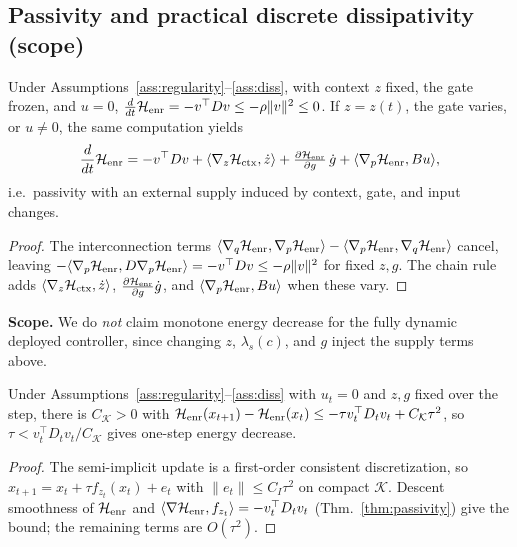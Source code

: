 \subsection{Passivity and practical discrete dissipativity (scope)}
\begin{theorem}\label{thm:passivity}
Under Assumptions~\ref{ass:regularity}--\ref{ass:diss}, with context $z$ fixed,
the gate frozen, and $u=0$,
$\frac{d}{dt}\mathcal{H}_{\rm enr}=-v^\top D v\le-\rho\|v\|^2\le0$. If $z=z(t)$, the
gate varies, or $u\ne0$, the same computation yields
\[
  \frac{d}{dt}\mathcal{H}_{\rm enr}
  =-v^\top D v
  +\langle\nabla_z\mathcal{H}_{\rm ctx},\dot z\rangle
  +\tfrac{\partial\mathcal{H}_{\rm enr}}{\partial g}\,\dot g
  +\langle\nabla_p\mathcal{H}_{\rm enr},Bu\rangle,
\]
i.e.\ passivity with an external supply induced by context, gate, and input
changes.
\end{theorem}
\begin{proof}
The interconnection terms
$\langle\nabla_q\mathcal{H}_{\rm enr},\nabla_p\mathcal{H}_{\rm enr}\rangle
-\langle\nabla_p\mathcal{H}_{\rm enr},\nabla_q\mathcal{H}_{\rm enr}\rangle$ cancel, leaving
$-\langle\nabla_p\mathcal{H}_{\rm enr},D\nabla_p\mathcal{H}_{\rm enr}\rangle=-v^\top Dv\le-\rho\|v\|^2$
for fixed $z,g$. The chain rule adds
$\langle\nabla_z\mathcal{H}_{\rm ctx},\dot z\rangle$,
$\frac{\partial\mathcal{H}_{\rm enr}}{\partial g}\dot g$, and
$\langle\nabla_p\mathcal{H}_{\rm enr},Bu\rangle$ when these vary.
\end{proof}
\noindent\textbf{Scope.} We do \emph{not} claim monotone energy decrease for the
fully dynamic deployed controller, since changing $z$, $\lambda_s(c)$, and $g$ inject
the supply terms above.

\begin{theorem}\label{thm:discrete_passivity}
Under Assumptions~\ref{ass:regularity}--\ref{ass:diss} with $u_t=0$ and $z,g$
fixed over the step, there is $C_{\mathcal K}>0$ with
$\mathcal{H}_{\rm enr}(x_{t+1})-\mathcal{H}_{\rm enr}(x_t)\le-\tau v_t^\top D_t v_t+C_{\mathcal K}\tau^2$,
so $\tau<v_t^\top D_t v_t/C_{\mathcal K}$ gives one-step energy decrease.
\end{theorem}
\begin{proof}
The semi-implicit update is a first-order consistent discretization, so
$x_{t+1}=x_t+\tau f_{z_t}(x_t)+e_t$ with $\|e_t\|\le C_I\tau^2$ on compact
$\mathcal K$. Descent smoothness of $\mathcal{H}_{\rm enr}$ and
$\langle\nabla\mathcal{H}_{\rm enr},f_{z_t}\rangle=-v_t^\top D_t v_t$
(Thm.~\ref{thm:passivity}) give the bound; the remaining terms are $O(\tau^2)$.
\end{proof}

